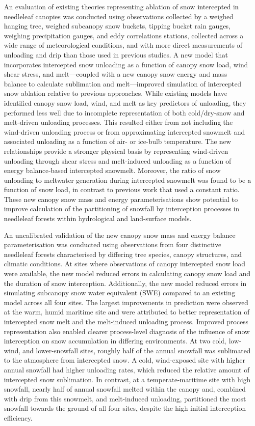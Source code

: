 {An evaluation of existing theories representing ablation of snow intercepted in needleleaf canopies was conducted using observations collected by a weighed hanging tree, weighed subcanopy snow buckets, tipping bucket rain gauges, weighing precipitation gauges, and eddy correlations stations, collected across a wide range of meteorological conditions, and with more direct measurements of unloading and drip than those used in previous studies. A new model that incorporates intercepted snow unloading as a function of canopy snow load, wind shear stress, and melt—coupled with a new canopy snow energy and mass balance to calculate sublimation and melt—improved simulation of intercepted snow ablation relative to previous approaches. While existing models have identified canopy snow load, wind, and melt as key predictors of unloading, they performed less well due to incomplete representation of both cold/dry-snow and melt-driven unloading processes. This resulted either from not including the wind-driven unloading process or from approximating intercepted snowmelt and associated unloading as a function of air- or ice-bulb temperature. The new relationships provide a stronger physical basis by representing wind-driven unloading through shear stress and melt-induced unloading as a function of energy balance-based intercepted snowmelt. Moreover, the ratio of snow unloading to meltwater generation during intercepted snowmelt was found to be a function of snow load, in contrast to previous work that used a constant ratio. These new canopy snow mass and energy parameterisations show potential to improve calculation of the partitioning of snowfall by interception processes in needleleaf forests within hydrological and land-surface models.

An uncalibrated validation of the new canopy snow mass and energy balance parameterisation was conducted using observations from four distinctive needleleaf forests characterised by differing tree species, canopy structures, and climatic conditions. At sites where observations of canopy intercepted snow load were available, the new model reduced errors in calculating canopy snow load and the duration of snow interception. Additionally, the new model reduced errors in simulating subcanopy snow water equivalent (SWE) compared to an existing model across all four sites. The largest improvements in prediction were observed at the warm, humid maritime site and were attributed to better representation of intercepted snow melt and the melt-induced unloading process. Improved process representation also enabled clearer process-level diagnosis of the influence of snow interception on snow accumulation in differing environments. At two cold, low-wind, and lower-snowfall sites, roughly half of the annual snowfall was sublimated to the atmosphere from intercepted snow. A cold, wind-exposed site with higher annual snowfall had higher unloading rates, which reduced the relative amount of intercepted snow sublimation. In contrast, at a temperate-maritime site with high snowfall, nearly half of annual snowfall melted within the canopy and, combined with drip from this snowmelt, and melt-induced unloading, partitioned the most snowfall towards the ground of all four sites, despite the high initial interception efficiency.

}

